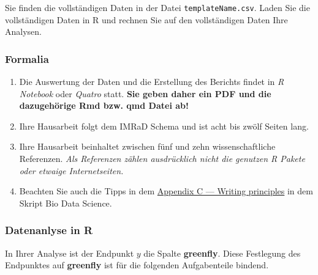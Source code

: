 \documentclass{scrartcl}\usepackage[]{graphicx}\usepackage[]{xcolor}
\begin{document}
\vspace{1Ex}

Sie finden die vollständigen Daten in der Datei \texttt{templateName.csv}. Laden Sie die vollständigen Daten in R und rechnen Sie auf den vollständigen Daten Ihre Analysen.

\subsubsection*{Formalia}

\begin{enumerate}
\item Die Auswertung der Daten und die Erstellung des Berichts findet in
  \textit{R Notebook} oder \textit{Quatro} statt. \textbf{Sie geben daher ein PDF und die dazugehörige Rmd bzw. qmd Datei ab!}
\item Ihre Hausarbeit folgt dem IMRaD Schema und ist acht bis zwölf Seiten lang. 
\item Ihre Hausarbeit beinhaltet zwischen fünf und zehn
  wissenschaftliche Referenzen. \textit{Als Referenzen zählen ausdrücklich nicht die genutzen R
    Pakete oder etwaige Internetseiten.}  
\item Beachten Sie auch die Tipps in dem \href{https://jkruppa.github.io/app-how-to-write.html}{Appendix C — Writing principles} in dem Skript Bio Data Science.   
\end{enumerate}

\subsubsection*{Datenanlyse in R}

In Ihrer Analyse ist der Endpunkt $y$ die Spalte \textbf{greenfly}. Diese Festlegung des Endpunktes auf \textbf{greenfly} ist für die folgenden Aufgabenteile bindend. 
\end{document}
